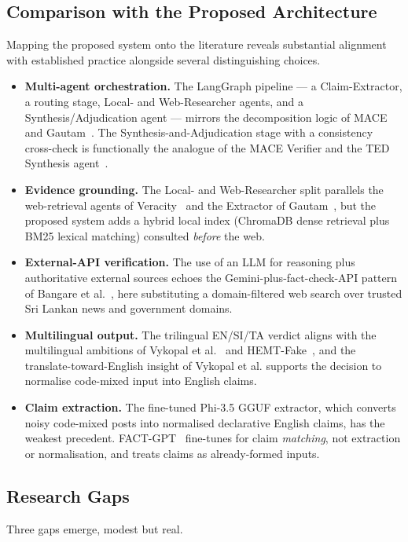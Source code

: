 \documentclass[12pt,a4paper]{article}
\begin{document}
\subsection{Comparison with the Proposed Architecture}
Mapping the proposed system onto the literature reveals substantial alignment with
established practice alongside several distinguishing choices.

\begin{itemize}
    \item \textbf{Multi-agent orchestration.} The LangGraph pipeline --- a
    Claim-Extractor, a routing stage, Local- and Web-Researcher agents, and a
    Synthesis/Adjudication agent --- mirrors the decomposition logic of
    MACE~\cite{mace} and Gautam~\cite{gautam}. The Synthesis-and-Adjudication stage
    with a consistency cross-check is functionally the analogue of the MACE
    Verifier and the TED Synthesis agent~\cite{ted}.
    \item \textbf{Evidence grounding.} The Local- and Web-Researcher split
    parallels the web-retrieval agents of Veracity~\cite{veracity} and the
    Extractor of Gautam~\cite{gautam}, but the proposed system adds a hybrid local
    index (ChromaDB dense retrieval plus BM25 lexical matching) consulted
    \textit{before} the web.
    \item \textbf{External-API verification.} The use of an LLM for reasoning plus
    authoritative external sources echoes the Gemini-plus-fact-check-API pattern of
    Bangare et al.~\cite{bangare}, here substituting a domain-filtered web search
    over trusted Sri Lankan news and government domains.
    \item \textbf{Multilingual output.} The trilingual EN/SI/TA verdict aligns with
    the multilingual ambitions of Vykopal et al.~\cite{vykopal} and
    HEMT-Fake~\cite{hemtfake}, and the translate-toward-English insight of
    Vykopal et al. supports the decision to normalise code-mixed input into English
    claims.
    \item \textbf{Claim extraction.} The fine-tuned Phi-3.5 GGUF extractor, which
    converts noisy code-mixed posts into normalised declarative English claims, has
    the weakest precedent. FACT-GPT~\cite{factgpt} fine-tunes for claim
    \textit{matching}, not extraction or normalisation, and treats claims as
    already-formed inputs.
\end{itemize}

\subsection{Research Gaps}
Three gaps emerge, modest but real.
\end{document}
